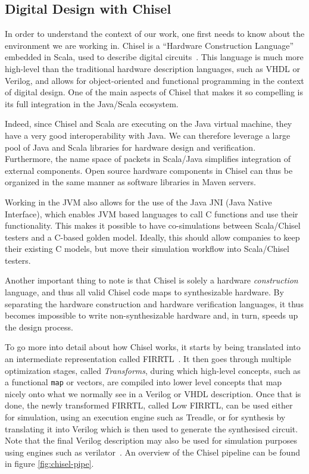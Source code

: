 \documentclass[conference]{IEEEtran}
\begin{document}
\subsection{Digital Design with Chisel}
In order to understand the context of our work, one first needs to know about the environment we are working in.
Chisel is a ``Hardware Construction Language'' embedded in Scala, used to describe digital circuits~\cite{chisel:dac2012}.
This language is much more high-level than the traditional hardware description languages, such as VHDL or Verilog, and allows for object-oriented and functional programming in the context of digital design.
One of the main aspects of Chisel that makes it so compelling is its full integration in the Java/Scala ecosystem.

Indeed, since Chisel and Scala are executing on the Java virtual machine, they have a very good interoperability with Java. 
We can therefore leverage a large pool of Java and Scala libraries for hardware design and verification. 
Furthermore, the name space of packets in Scala/Java simplifies integration of external components.
Open source hardware components in Chisel can thus be organized in the same manner as software libraries in Maven servers.

Working in the JVM also allows for the use of the Java JNI (Java Native Interface), which enables JVM based languages to call C functions and use their functionality.
This makes it possible to have co-simulations between Scala/Chisel testers and a C-based golden model. 
Ideally, this should allow companies to keep their existing C models, but move their simulation workflow into Scala/Chisel testers.

Another important thing to note is that Chisel is solely a hardware \emph{construction} language, and thus all valid Chisel code maps to synthesizable hardware.
By separating the hardware construction and hardware verification languages, it thus becomes impossible to write non-synthesizable hardware and, in turn, speeds up the design process.

To go more into detail about how Chisel works, it starts by being translated into an intermediate representation called FIRRTL~\cite{firrtl}. It then goes through multiple optimization stages, called \textit{Transforms}, during which high-level concepts, such as a functional \texttt{map} or vectors, are compiled into lower level concepts that map nicely onto what we normally see in a Verilog or VHDL description. Once that is done, the newly transformed FIRRTL, called Low FIRRTL, can be used either for simulation, using an execution engine such as Treadle, or for synthesis by translating it into Verilog which is then used to generate the synthesised circuit. Note that the final Verilog description may also be used for simulation purposes using engines such as verilator~\cite{verilator}. An overview of the Chisel pipeline can be found in figure \ref{fig:chisel-pipe}.
\end{document}
